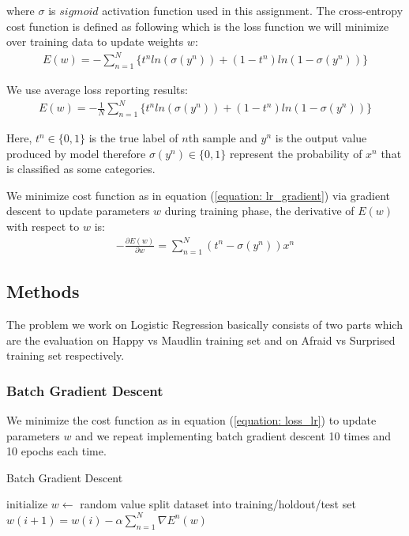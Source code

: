 \documentclass{article}
\begin{document}
where $\sigma$ is $sigmoid$ activation function used in this assignment. The cross-entropy cost function is defined as following which is the loss function we will minimize over training data to update weights $w$:
\begin{align}
    E(w) = -\sum_{n=1}^{N}\{t^{n}ln(\sigma(y^{n}))+(1-t^{n})ln(1-\sigma(y^{n}))\}
\end{align}

We use average loss reporting results:
\begin{align}
    E(w) = -\frac{1}{N}\sum_{n=1}^{N}\{t^{n}ln(\sigma(y^{n}))+(1-t^{n})ln(1-\sigma(y^{n}))\}
    \label{equation: loss_lr}
\end{align}

Here, $t^{n}\in \{0,1\}$ is the true label of $n$th sample and $y^{n}$ is the output value produced by model therefore $\sigma(y^{n})\in \{0,1\}$ represent the probability of $x^{n}$ that is classified as some categories.

We minimize cost function as in equation (\ref{equation: lr_gradient}) via gradient descent to update parameters $w$ during training phase, the derivative of $E(w)$ with respect to $w$ is:
\begin{align}
    -\frac{\partial E(w)}{\partial w} = \sum_{n=1}^{N}(t^{n}-\sigma(y^{n}))x^{n}
    \label{equation: lr_gradient}
\end{align}

\subsection{Methods}

The problem we work on Logistic Regression basically consists of two parts which are the evaluation on Happy vs Maudlin training set and on Afraid vs Surprised training set respectively.

\subsubsection{Batch Gradient Descent}

We minimize the cost function as in equation (\ref{equation: loss_lr}) to update parameters $w$ and we repeat implementing batch gradient descent 10 times and 10 epochs each time.

\begin{algorithm}
  \caption{Batch Gradient Descent}
  \begin{algorithmic}[1]
    \State initialize $w\leftarrow$ random value
      \State split dataset into training/holdout/test set
        \State $w(i+1)=w(i)-\alpha \sum_{n=1}^{N}\nabla E^{n}(w)$
      \EndFor
    \EndFor
  \end{algorithmic}
\end{algorithm}
\end{document}

